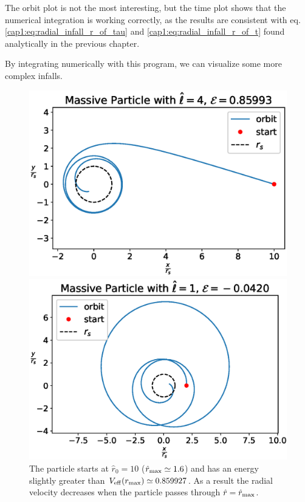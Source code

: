 The orbit plot is not the most interesting, but the time plot shows that the
numerical integration is working correctly, as the results are consistent with
eq. \ref{cap1:eq:radial_infall_r_of_tau} and \ref{cap1:eq:radial_infall_r_of_t}
found analytically in the previous chapter.

By integrating numerically with this program, we can visualize some more
complex infalls.

\begin{figure}[h!]
    \begin{minipage}{0.48\textwidth}
        \centering
        \includegraphics[width=\textwidth]{Figures/chapter2/infall1.eps}
        \caption{The particle starts at $\hat r_0 = 10$
        ($\hat r_{\rm max} \simeq 1.6$) and has an energy slightly greater than
        $V_{\rm eff}(r_{\rm max}) \simeq 0.859927$.
        As a result the radial velocity decreases when the particle passes
        through $\hat r = \hat r_{\rm max}$.}
    \end{minipage}
    \hspace{0.015 \textwidth}
    \begin{minipage}{0.48\textwidth}
        \centering
        \includegraphics[width=\textwidth]{Figures/chapter2/infall2.eps}

\end{minipage}
\end{figure}
